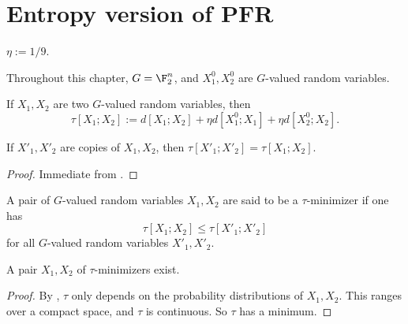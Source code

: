\chapter{Entropy version of PFR}

\begin{definition}\label{eta-def}
 \leanok
  $\eta := 1/9$.
\end{definition}

Throughout this chapter,  $G = \F_2^n$, and $X^0_1, X^0_2$ are $G$-valued random variables.

\begin{definition}\label{tau-def}
  \leanok
If $X_1,X_2$ are two $G$-valued random variables, then
$$  \tau[X_1; X_2] := d[X_1; X_2] + \eta  d[X^0_1; X_1] + \eta d[X^0_2; X_2].$$
\end{definition}

\begin{lemma}\label{tau-copy}\leanok
    If $X'_1, X'_2$ are copies of $X_1,X_2$, then $\tau[X'_1;X'_2] = \tau[X_1;X_2]$.
\end{lemma}


\begin{proof}\leanok Immediate from .
\end{proof}

\begin{definition}\label{tau-min-def}
\leanok
A pair of $G$-valued random variables $X_1, X_2$ are said to be a $\tau$-minimizer if one has
  $$\tau[X_1;X_2] \leq \tau[X'_1;X'_2]
  $$
for all $G$-valued random variables $X'_1, X'_2$.
\end{definition}


\begin{proposition}\label{tau-min}
  \leanok
A pair $X_1, X_2$ of $\tau$-minimizers exist.
\end{proposition}

\begin{proof}\leanok By , $\tau$ only depends on the probability distributions of $X_1, X_2$. This ranges over a compact space, and $\tau$ is continuous.  So $\tau$ has a minimum.
\end{proof}

